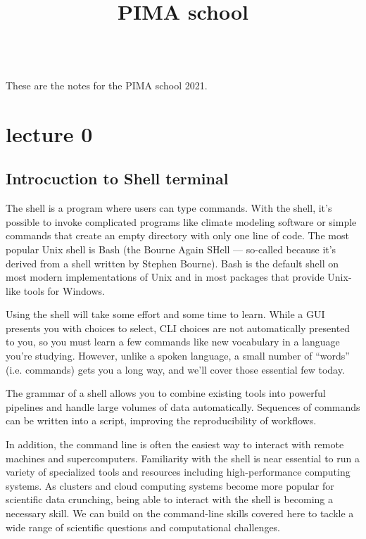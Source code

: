 \documentclass[11pt]{book}
\begin{document}
\title{PIMA school}

\maketitle

\frontmatter
\tableofcontents
\mainmatter

~\\
These are the notes for the PIMA school 2021.



\chapter{lecture 0}

\section{Introcuction to Shell terminal}
The shell is a program where users can type commands. With the shell, it’s possible to invoke complicated programs like climate modeling software or simple commands that create an empty directory with only one line of code. The most popular Unix shell is Bash (the Bourne Again SHell — so-called because it’s derived from a shell written by Stephen Bourne). Bash is the default shell on most modern implementations of Unix and in most packages that provide Unix-like tools for Windows.

Using the shell will take some effort and some time to learn. While a GUI presents you with choices to select, CLI choices are not automatically presented to you, so you must learn a few commands like new vocabulary in a language you’re studying. However, unlike a spoken language, a small number of “words” (i.e. commands) gets you a long way, and we’ll cover those essential few today.

The grammar of a shell allows you to combine existing tools into powerful pipelines and handle large volumes of data automatically. Sequences of commands can be written into a script, improving the reproducibility of workflows.

In addition, the command line is often the easiest way to interact with remote machines and supercomputers. Familiarity with the shell is near essential to run a variety of specialized tools and resources including high-performance computing systems. As clusters and cloud computing systems become more popular for scientific data crunching, being able to interact with the shell is becoming a necessary skill. We can build on the command-line skills covered here to tackle a wide range of scientific questions and computational challenges.
\end{document}
